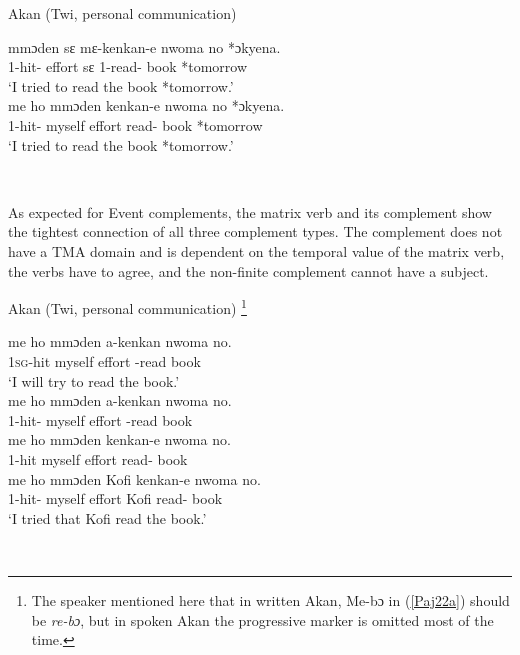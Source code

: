 \documentclass[output=paper]{langscibook}
\begin{document}
\begin{exe}
\ex \label{Paj21} Akan (Twi, personal communication)
\begin{xlist}

\ex \label{Paj21a} 
 {mmɔden} {sɛ} {mɛ-kenkan-e} {nwoma} {no} *{ɔkyena.}\\
    1{\sg}-hit-{\compl} effort s{ɛ} 1{\sg}-read-{\compl} book  *tomorrow\\
\glt `I tried to read the book *tomorrow.'\\

\ex \label{Paj21b} 
 {me ho} {mmɔden} {kenkan-e} {nwoma} {no} *{ɔkyena.}\\
    1{\sg}-hit-{\compl} myself effort read-{\compl} book  *tomorrow\\
\glt `I tried to read the book *tomorrow.'\\

\end{xlist}
\end{exe}
 \

As expected for Event complements, the matrix verb and its complement show the tightest connection of all three complement types. The complement does not have a TMA domain and is dependent on the temporal value of the matrix verb, the verbs have to agree, and the non-finite complement cannot have a subject.  

\begin{exe}
\ex \label{Paj22} Akan (Twi, personal communication) \footnote{The speaker mentioned here that in written Akan, {Me-bɔ} in (\ref{Paj22a}) should be \emph{re-bɔ}, but in spoken Akan the progressive marker is omitted most of the time.}
\begin{xlist}

\ex \label{Paj22a} 
 {me ho } {mmɔden} {a-kenkan} {nwoma} {no. }\\
   1{\textsc{sg}}-hit myself effort -read book \\
\glt `I will try to read the book.'\\

\ex \label{Paj22b} 
 {me ho } {mmɔden} {a-kenkan} {nwoma} {no.}\\
    1{\sg}-hit-{\compl} myself effort -read book  \\

\ex \label{Paj22c} 
  {me ho } {mmɔden} {kenkan-e} {nwoma} {no.}\\
    1{\sg}-hit myself effort read-{\compl} book  \\

\ex \label{Paj22d} 
  {me ho } {mmɔden} {Kofi} {kenkan-e} {nwoma} {no.}\\
    1{\sg}-hit-{\compl} myself effort Kofi read-{\compl} book  \\
\glt *`I tried that Kofi read the book.'\\


\end{xlist}
\end{exe}
 \
\end{document}
